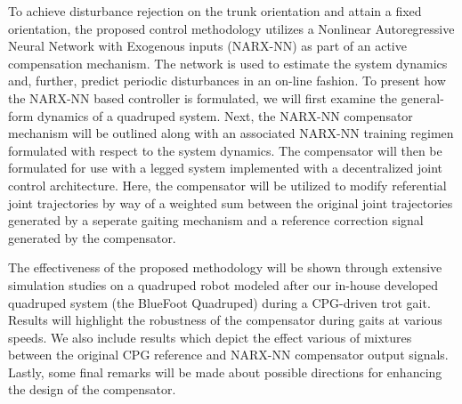 To achieve disturbance rejection on the trunk orientation and attain a fixed orientation, the proposed control methodology utilizes a Nonlinear Autoregressive Neural Network with Exogenous inputs (NARX-NN) as part of an active compensation mechanism. The network is used to estimate the system dynamics and, further, predict periodic disturbances in an on-line fashion. To present how the NARX-NN based controller is formulated, we will first examine the general-form dynamics of a quadruped system. Next, the NARX-NN compensator mechanism will be outlined along with an associated NARX-NN training regimen formulated with respect to the system dynamics. The compensator will then be formulated for use with a legged system implemented with a decentralized joint control architecture. Here, the compensator will be utilized to modify referential joint trajectories by way of a weighted sum between the original joint trajectories generated by a seperate gaiting mechanism and a reference correction signal generated by the compensator.

The effectiveness of the proposed methodology will be shown through extensive simulation studies on a quadruped robot modeled after our in-house developed quadruped system (the BlueFoot Quadruped) during a CPG-driven trot gait. Results will highlight the robustness of the compensator during gaits at various speeds. We also include results which depict the effect various of mixtures between the original CPG reference and NARX-NN compensator output signals. Lastly, some final remarks will be made about possible directions for enhancing the design of the compensator.